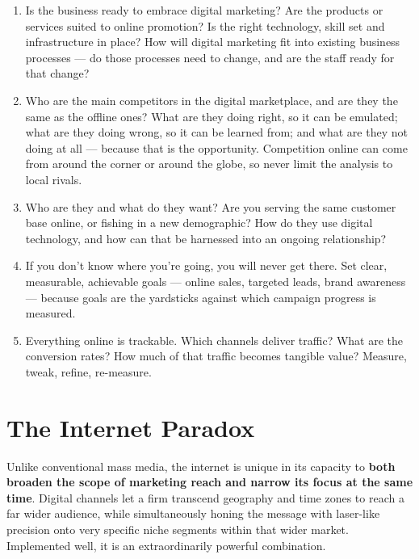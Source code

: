 \documentclass{MMTextbook}
\begin{document}
\begin{enumerate}
\item {} Is the business ready to embrace digital
      marketing? Are the products or services suited to online promotion? Is
      the right technology, skill set and infrastructure in place? How will
      digital marketing fit into existing business processes --- do those
      processes need to change, and are the staff ready for that change?
\item {} Who are the main competitors in the digital
      marketplace, and are they the same as the offline ones? What are they
      doing right, so it can be emulated; what are they doing wrong, so it can
      be learned from; and what are they not doing at all --- because that is
      the opportunity. Competition online can come from around the corner or
      around the globe, so never limit the analysis to local rivals.
\item {} Who are they and what do they want? Are you
      serving the same customer base online, or fishing in a new demographic?
      How do they use digital technology, and how can that be harnessed into an
      ongoing relationship?
\item {} If you don't know where you're
      going, you will never get there. Set clear, measurable, achievable goals
      --- online sales, targeted leads, brand awareness --- because goals are
      the yardsticks against which campaign progress is measured.
\item {} Everything online is trackable. Which
      channels deliver traffic? What are the conversion rates? How much of that
      traffic becomes tangible value? Measure, tweak, refine, re-measure.
\end{enumerate}

\section{The Internet Paradox}

\begin{keybox}
Unlike conventional mass media, the internet is unique in its capacity to
\textbf{both broaden the scope of marketing reach and narrow its focus at the
same time}. Digital channels let a firm transcend geography and time zones to
reach a far wider audience, while simultaneously honing the message with
laser-like precision onto very specific niche segments within that wider
market. Implemented well, it is an extraordinarily powerful combination.
\end{keybox}
\end{document}
